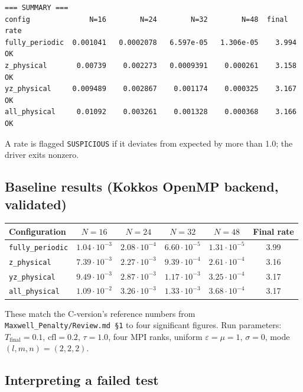 \documentclass[11pt]{article}
\newcommand{\eps}{\varepsilon}
\begin{document}
\begin{verbatim}
=== SUMMARY ===
config              N=16        N=24        N=32        N=48  final rate
fully_periodic  0.001041   0.0002078   6.597e-05   1.306e-05    3.994   OK
z_physical       0.00739    0.002273   0.0009391    0.000261    3.158   OK
yz_physical     0.009489    0.002867    0.001174    0.000325    3.167   OK
all_physical     0.01092    0.003261    0.001328    0.000368    3.166   OK
\end{verbatim}

A rate is flagged \texttt{SUSPICIOUS} if it deviates from expected
by more than 1.0; the driver exits nonzero.

\subsection{Baseline results (Kokkos OpenMP backend, validated)}

\begin{center}
\small
\begin{tabular}{lcccc|c}
\toprule
Configuration            & $N=16$               & $N=24$              & $N=32$             & $N=48$              & Final rate \\
\midrule
\texttt{fully\_periodic} & $1.04\cdot 10^{-3}$  & $2.08\cdot 10^{-4}$ & $6.60\cdot 10^{-5}$ & $1.31\cdot 10^{-5}$ & 3.99 \\
\texttt{z\_physical}     & $7.39\cdot 10^{-3}$  & $2.27\cdot 10^{-3}$ & $9.39\cdot 10^{-4}$ & $2.61\cdot 10^{-4}$ & 3.16 \\
\texttt{yz\_physical}    & $9.49\cdot 10^{-3}$  & $2.87\cdot 10^{-3}$ & $1.17\cdot 10^{-3}$ & $3.25\cdot 10^{-4}$ & 3.17 \\
\texttt{all\_physical}   & $1.09\cdot 10^{-2}$  & $3.26\cdot 10^{-3}$ & $1.33\cdot 10^{-3}$ & $3.68\cdot 10^{-4}$ & 3.17 \\
\bottomrule
\end{tabular}
\end{center}

These match the C-version's reference numbers from
\texttt{Maxwell\_Penalty/Review.md \S 1} to four significant
figures.  Run parameters: $T_{\text{final}} = 0.1$,
$\mathrm{cfl} = 0.2$, $\tau = 1.0$, four MPI ranks, uniform
$\eps = \mu = 1$, $\sigma = 0$, mode $(l, m, n) = (2, 2, 2)$.

\subsection{Interpreting a failed test}
\end{document}
